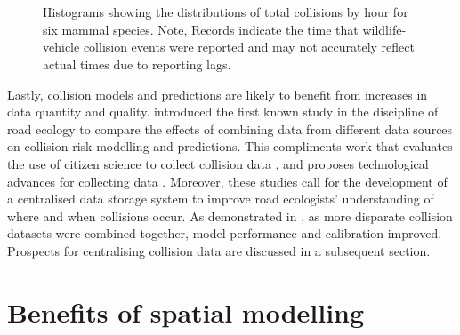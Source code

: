 \begin{figure*}[!t]
  \centering
	\begin{minipage}[t]{.9\textwidth}
    	\centering
    	\hspace{.05\textwidth}
    	\\ 
    	\hspace{.05\textwidth}
    	\\
    	\hspace{.05\textwidth}
    \end{minipage}
  \caption[Total collisions by hour for six mammal species]{Histograms showing the distributions of total collisions by hour for six mammal species. Note, Records indicate the time that wildlife-vehicle collision events were reported and may not accurately reflect actual times due to reporting lags.}
  \label{temporal_all}
\end{figure*}

Lastly, collision models and predictions are likely to benefit from increases in data quantity and quality.  introduced the first known study in the discipline of road ecology to compare the effects of combining data from different data sources on collision risk modelling and predictions. This compliments work that evaluates the use of citizen science to collect collision data \citep{paul14, dwye16}, and proposes technological advances for collecting data \citep{olso14}. Moreover, these studies call for the development of a centralised data storage system to improve road ecologists' understanding of where and when collisions occur. As demonstrated in , as more disparate collision datasets were combined together, model performance and calibration improved. Prospects for centralising collision data are discussed in a subsequent section. 

\section{Benefits of spatial modelling}


